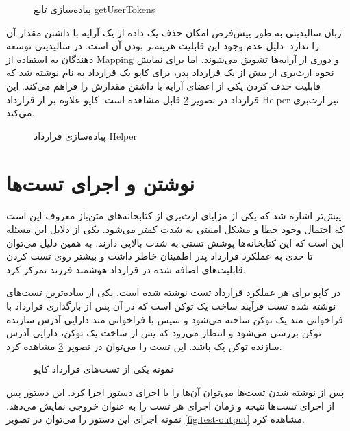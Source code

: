 \begin{figure}
\centerline{}
\caption{پیاده‌سازی تابع getUserTokens}
\label{fig:getUserTokens}
\end{figure}

زبان سالیدیتی به طور پیش‌فرض امکان حذف یک داده از یک آرایه با داشتن مقدار آن را ندارد.
دلیل عدم وجود این قابلیت هزینه‌بر بودن آن است.
در سالیدیتی توسعه دهندگان به استفاده از
\gls{Mapping}
و دوری از آرایه‌ها تشویق می‌شوند.
اما برای نمایش نحوه ارث‌بری از بیش از یک قرارداد پدر، برای کاپو یک قرارداد به نام
نوشته شد که قابلیت حذف کردن یکی از اعضای آرایه با داشتن مقدارش را فراهم می‌کند.
این قرارداد در تصویر
\ref{fig:Helper}
قابل مشاهده است. کاپو علاوه بر
از قرارداد Helper نیز ارث‌بری می‌کند.

\begin{figure}
\centerline{}
\caption{پیاده‌سازی قرارداد Helper}
\label{fig:Helper}
\end{figure}

\section{نوشتن و اجرای تست‌ها}
پیش‌تر اشاره شد که یکی از مزایای ارث‌بری از کتابخانه‌های متن‌باز معروف
این است که احتمال وجود خطا و مشکل امنیتی به شدت کمتر می‌شود.
یکی از دلایل این مسئله این است که این کتابخانه‌ها پوشش تستی به شدت بالایی دارند.
به همین دلیل می‌توان تا حدی به عملکرد قرارداد پدر اطمینان خاطر داشت
و بیشتر روی تست کردن قابلیت‌های اضافه شده در قرارداد هوشمند فرزند تمرکز کرد.

در کاپو برای هر عملکرد قرارداد تست نوشته شده است.
یکی از ساده‌ترین تست‌های نوشته شده تست فرآیند ساخت یک توکن است که در آن پس از بارگذاری قرارداد با فراخوانی متد
یک توکن ساخته می‌شود و سپس با فراخوانی متد
دارایی آدرس سازنده توکن بررسی می‌شود و انتظار می‌رود که پس از ساخت یک توکن، دارایی آدرس سازنده توکن یک باشد.
این تست را می‌توان در تصویر
\ref{fig:mint-test}
مشاهده کرد.

\begin{figure}
\centerline{}
\caption{نمونه یکی از تست‌های قرارداد کاپو}
\label{fig:mint-test}
\end{figure}

پس از نوشته شدن تست‌ها می‌توان آن‌ها را با اجرای دستور
اجرا کرد.
این دستور پس از اجرای تست‌ها نتیجه و زمان اجرای هر تست را به عنوان خروجی نمایش می‌دهد.
نمونه اجرای این دستور را می‌توان در تصویر
\ref{fig:test-output}
مشاهده کرد.

